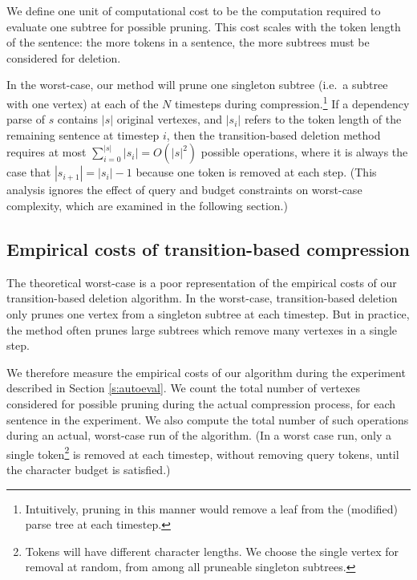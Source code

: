 \documentclass[11pt,a4paper]{article}
\begin{document}
We define one unit of computational cost to be the computation required to evaluate one subtree for possible pruning. This cost scales with the token length of the sentence: the more tokens in a sentence, the more subtrees must be considered for deletion.  %

In the worst-case, our method will prune one singleton subtree (i.e.\ a subtree with one vertex) at each of the $N$ timesteps during compression.\footnote{Intuitively, pruning in this manner would remove a leaf from the (modified) parse tree at each timestep.} If a dependency parse of $s$ contains $|s|$ original vertexes, and $|s_i|$ refers to the token length of the remaining sentence at timestep $i$, then the transition-based deletion method requires at most ${\sum_{i = 0}^{|s|} |s_i | = O(|s|^2)}$ possible operations, where it is always the case that $|s_{i + 1}| = |s_{i}|  - 1$ because one token is removed at each step. (This analysis ignores the effect of query and budget constraints on worst-case complexity, which are examined in the following section.)

\subsection{Empirical costs of transition-based compression}\label{s:empiricalcost}

The theoretical worst-case is a poor representation of the empirical costs of our transition-based deletion algorithm. In the worst-case, transition-based deletion only prunes one vertex from a singleton subtree at each timestep. But in practice, the method often prunes large subtrees which remove many vertexes in a single step. 


We therefore measure the empirical costs of our algorithm during the experiment described in Section \ref{s:autoeval}. We count the total number of vertexes considered for possible pruning during the actual compression process, for each sentence in the experiment. We also compute the total number of such operations during an actual, worst-case run of the algorithm. (In a worst case run, only a single token\footnote{Tokens will have different character lengths. We choose the single vertex for removal at random, from among all pruneable singleton subtrees.} is removed at each timestep, without removing query tokens, until the character budget is satisfied.) 
\end{document}
